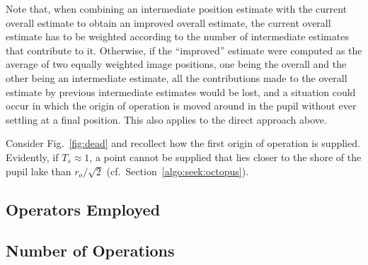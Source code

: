 Note that, when combining an intermediate position estimate with the
current overall estimate to obtain an improved overall estimate, the
current overall estimate has to be weighted according to the number of
intermediate estimates that contribute to it.  Otherwise, if the
``improved'' estimate were computed as the average of two equally
weighted image positions, one being the overall and the other being an
intermediate estimate, all the contributions made to the overall
estimate by previous intermediate estimates would be lost, and a
situation could occur in which the origin of operation is moved around
in the pupil without ever settling at a final position.  This also
applies to the direct approach above.

Consider Fig.~\ref{fig:dead} and recollect how the first origin of
operation is supplied.  Evidently, if $T_{s}\approx 1$, a point cannot
be supplied that lies closer to the shore of the pupil lake than
$r_{o}/\sqrt{2}$ (cf.\ Section~\ref{algo:seek:octopus}).

\subsection{Operators Employed}
\label{algo:pos:operators}

\subsection{Number of Operations}
\label{algo:pos:O}

